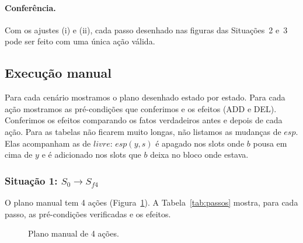 \documentclass[11pt,a4paper]{article}
\newcommand{\mesa}{%
  \draw[line width=0.7pt] (0,0) -- (3,0);
  \foreach \i in {0,...,6}{\draw (\i*0.5,0) -- (\i*0.5,-0.07);
    \node[below,inner sep=1pt,font=\tiny] at (\i*0.5,-0.07) {\i};}}
\newcommand{\bl}[4]{%
  \filldraw[fill=cor#4,draw=black!70] (#1*0.5,#2*0.5) rectangle ++(#3*0.5,0.5);
  \node[font=\small] at (#1*0.5+#3*0.25,#2*0.5+0.25) {\textit{#4}};}
\newcommand{\rot}[1]{\node[font=\small] at (1.5,1.35) {#1};}
\newcommand{\Szero}{\bl{0}{0}{2}{c}\bl{3}{0}{1}{a}\bl{5}{0}{1}{b}\bl{3}{1}{3}{d}}
\newcommand{\Sum}{\bl{0}{0}{2}{c}\bl{3}{0}{1}{a}\bl{5}{0}{1}{b}\bl{0}{1}{3}{d}}
\newcommand{\Sdois}{\bl{0}{0}{2}{c}\bl{0}{1}{3}{d}\bl{5}{0}{1}{b}\bl{5}{1}{1}{a}}
\newcommand{\Stres}{\bl{0}{0}{2}{c}\bl{2}{0}{3}{d}\bl{5}{0}{1}{b}\bl{5}{1}{1}{a}}
\newcommand{\Sfq}{\bl{0}{0}{2}{c}\bl{2}{0}{3}{d}\bl{5}{0}{1}{b}\bl{0}{1}{1}{a}}
\newcommand{\livre}{\mathit{livre}}
\newcommand{\esp}{\mathit{esp}}
\begin{document}
\paragraph{Conferência.} Com os ajustes (i) e (ii), cada passo desenhado nas figuras
das Situações~2 e~3 pode ser feito com uma única ação válida.

\subsection{Execução manual}
\label{sec:manual}
Para cada cenário mostramos o plano desenhado estado por estado. Para cada ação
mostramos as pré-condições que conferimos e os efeitos (ADD e DEL). Conferimos os
efeitos comparando os fatos verdadeiros antes e depois de cada ação. Para as tabelas
não ficarem muito longas, não listamos as mudanças de $\esp$. Elas acompanham as de
$\livre$: $\esp(y,s)$ é apagado nos slots onde $b$ pousa em cima de $y$ e é
adicionado nos slots que $b$ deixa no bloco onde estava.

\subsubsection{Situação 1: \texorpdfstring{$S_0 \to S_{f4}$}{S0 -> Sf4}}
\label{sec:manual1}
O plano manual tem 4 ações (Figura~\ref{fig:plano}). A Tabela~\ref{tab:passos}
mostra, para cada passo, as pré-condições verificadas e os efeitos.

\begin{figure}[H]
\centering
{}
\caption{Plano manual de 4 ações.}
\label{fig:plano}
\end{figure}
\end{document}
